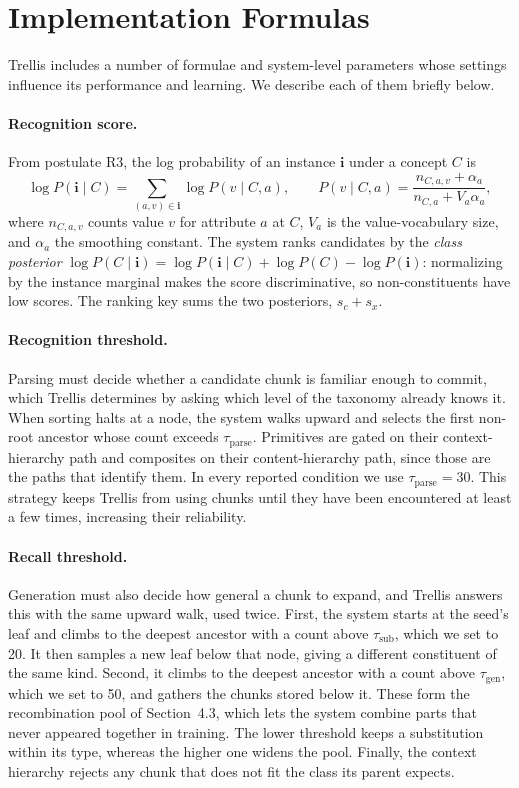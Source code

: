 \documentclass[11pt,letterpaper]{article}
\def\trellis/{{\sc Trellis}}
\begin{document}
\section{Implementation Formulas}
\label{app:formulas}

\trellis/ includes a number of formulae and system-level parameters 
whose settings influence its performance and learning. We describe 
each of them briefly below. 

\paragraph{Recognition score.}
From postulate R3, the log probability of an instance $\mathbf{i}$ under 
a concept $C$ is 
\[
\log P(\mathbf{i} \mid C) = \sum_{(a, v) \in \mathbf{i}} \log P(v \mid C, a), \qquad P(v \mid C, a) = \frac{n_{C,a,v} + \alpha_a}{n_{C,a} + V_a \alpha_a},
\]
where $n_{C,a,v}$ counts value $v$ for attribute $a$ at $C$, $V_a$ is the value-vocabulary size, and $\alpha_a$ the smoothing constant. The system 
ranks candidates by the \emph{class posterior} $\log P(C \mid \mathbf{i}) = 
\log P(\mathbf{i} \mid C) + \log P(C) - \log P(\mathbf{i})$: normalizing by the instance marginal makes the score discriminative, so non-constituents 
have low scores. The ranking key sums the two posteriors, $s_c + s_x$.

\paragraph{Recognition threshold.}
Parsing must decide whether a candidate chunk is familiar enough to
commit, which \trellis/ determines by asking which level of the 
taxonomy already knows it. When sorting halts at a node, the 
system walks upward and selects the first non-root ancestor whose 
count exceeds $\tau_{\text{parse}}$. 
Primitives are gated on their context-hierarchy path and composites on
their content-hierarchy path, since those are the paths that identify
them. In every reported condition we use $\tau_{\text{parse}} = 30$.
This strategy keeps \trellis/ from using chunks until they have 
been encountered at least a few times, increasing their reliability. 

\paragraph{Recall threshold.}
Generation must also decide how general a chunk to expand, and
\trellis/ answers this with the same upward walk, used twice. First,
the system starts at the seed's leaf and climbs to the deepest ancestor
with a count above $\tau_{\text{sub}}$, which we set to 20. It then
samples a new leaf below that node, giving a different constituent of
the same kind. Second, it climbs to the deepest ancestor with a count
above $\tau_{\text{gen}}$, which we set to 50, and gathers the chunks
stored below it. These form the recombination pool of Section~4.3,
which lets the system combine parts that never appeared together in
training. The lower threshold keeps a substitution within its type,
whereas the higher one widens the pool. Finally, the context hierarchy
rejects any chunk that does not fit the class its parent expects.
\end{document}
